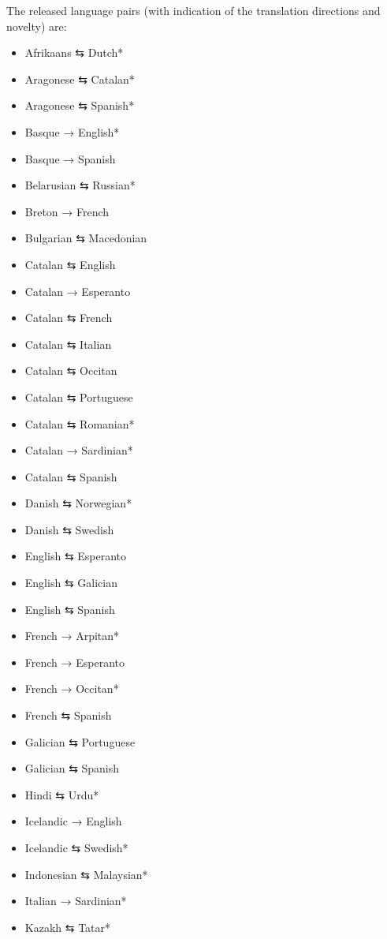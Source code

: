 \documentclass[free]{flammie}
\begin{document}
\noindent The released language pairs (with indication of the translation directions and novelty) are:
\begin{multicols}{2}
\begin{itemize}
    \item Afrikaans {⇆} Dutch*
    \item Aragonese {⇆} Catalan*
    \item Aragonese {⇆} Spanish*
    \item Basque {→} English*
    \item Basque {→} Spanish
    \item Belarusian {⇆} Russian*
    \item Breton {→} French
    \item Bulgarian {⇆} Macedonian
    \item Catalan {⇆} English
    \item Catalan {→} Esperanto
    \item Catalan {⇆} French
    \item Catalan {⇆} Italian
    \item Catalan {⇆} Occitan
    \item Catalan {⇆} Portuguese
    \item Catalan {⇆} Romanian*
    \item Catalan {→} Sardinian*
    \item Catalan {⇆} Spanish
    \item Danish {⇆} Norwegian*
    \item Danish {⇆} Swedish
    \item English {⇆} Esperanto
    \item English {⇆} Galician
    \item English {⇆} Spanish
    \item French {→} Arpitan*
    \item French {→} Esperanto
    \item French {→} Occitan*
    \item French {⇆} Spanish
    \item Galician {⇆} Portuguese
    \item Galician {⇆} Spanish
    \item Hindi {⇆} Urdu*
    \item Icelandic {→} English
    \item Icelandic {⇆} Swedish*
    \item Indonesian {⇆} Malaysian*
    \item Italian {→} Sardinian*
    \item Kazakh {⇆} Tatar*

\end{itemize}
\end{multicols}
\end{document}
